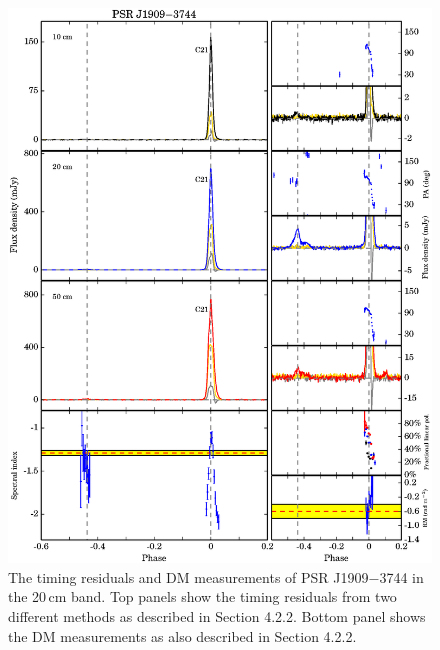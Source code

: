 \documentclass[useAMS,usenatbib]{mn2e}
\begin{document}
\begin{appendix}
\begin{figure}
\includegraphics[width=6 in]{1909.ps}
\caption{The timing residuals and DM measurements of PSR J1909$-$3744 in the 20\,cm band. 
Top panels show the timing residuals from two different methods as described in Section 4.2.2.
Bottom panel shows the DM measurements as also described in Section 4.2.2.
}
\label{1909resi}
\end{figure}
%
\begin{figure}
\center

\end{figure}
\end{appendix}
\end{document}
